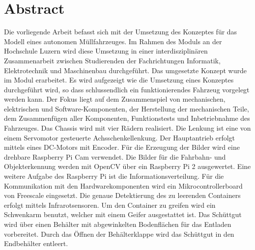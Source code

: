 \section*{Abstract}
Die vorliegende Arbeit befasst sich mit der Umsetzung des Konzeptes für das Modell eines autonomen Müllfahrzeuges. Im Rahmen des Moduls \grqq{} an der Hochschule Luzern wird diese Umsetzung in einer interdisziplinären Zusammenarbeit zwischen Studierenden der Fachrichtungen Informatik, Elektrotechnik und Maschinenbau durchgeführt. Das umgesetzte Konzept wurde im Modul \grqq{} erarbeitet. Es wird aufgezeigt wie die Umsetzung eines Konzeptes durchgeführt wird, so dass schlussendlich ein funktionierendes Fahrzeug vorgelegt werden kann. Der Fokus liegt auf dem Zusammenspiel von mechanischen, elektrischen und Software-Komponenten, der Herstellung der mechanischen Teile, dem Zusammenfügen aller Komponenten, Funktionstests und Inbetriebnahme des Fahrzeuges. Das Chassis wird mit vier Rädern realisiert. Die Lenkung ist eine von einem Servomotor gesteuerte Achsschenkellenkung. Der Hauptantrieb erfolgt mittels eines DC-Motors mit Encoder. Für die Erzeugung der Bilder wird eine drehbare Raspberry Pi Cam verwendet. Die Bilder für die Fahrbahn- und Objekterkennung werden mit OpenCV über ein Raspberry Pi 2 ausgewertet. Eine weitere Aufgabe des Raspberry Pi ist die Informationsverteilung. Für die Kommunikation mit den Hardwarekomponenten wird ein Mikrocontrollerboard von Freescale eingesetzt. Die genaue Detektierung des zu leerenden Containers erfolgt mittels Infrarotsensoren. Um den Container zu greifen wird ein Schwenkarm benutzt, welcher mit einem Geifer ausgestattet ist. Das Schüttgut wird über einen Behälter mit abgewinkelten Bodenflächen für das Entladen vorbereitet. Durch das Öffnen der Behälterklappe wird das Schüttgut in den Endbehälter entleert.
\clearpage